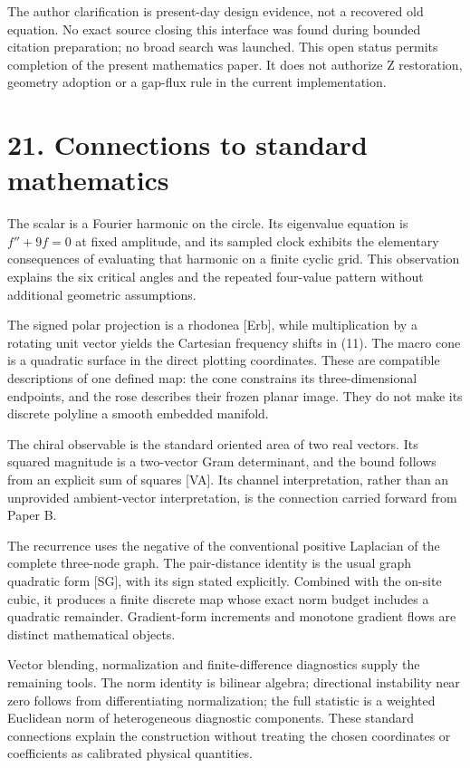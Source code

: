 \documentclass[
  11pt,
  a4paper,
]{article}
\begin{document}
The author clarification is present-day design evidence, not a recovered old equation. No exact source closing this interface was found during bounded citation preparation; no broad search was launched. This open status permits completion of the present mathematics paper. It does not authorize Z restoration, geometry adoption or a gap-flux rule in the current implementation.

\section{21. Connections to standard mathematics}\label{connections-to-standard-mathematics}

The scalar is a Fourier harmonic on the circle. Its eigenvalue equation is \(f''+9f=0\) at fixed amplitude, and its sampled clock exhibits the elementary consequences of evaluating that harmonic on a finite cyclic grid. This observation explains the six critical angles and the repeated four-value pattern without additional geometric assumptions.

The signed polar projection is a rhodonea {[}Erb{]}, while multiplication by a rotating unit vector yields the Cartesian frequency shifts in (11). The macro cone is a quadratic surface in the direct plotting coordinates. These are compatible descriptions of one defined map: the cone constrains its three-dimensional endpoints, and the rose describes their frozen planar image. They do not make its discrete polyline a smooth embedded manifold.

The chiral observable is the standard oriented area of two real vectors. Its squared magnitude is a two-vector Gram determinant, and the bound follows from an explicit sum of squares {[}VA{]}. Its channel interpretation, rather than an unprovided ambient-vector interpretation, is the connection carried forward from Paper B.

The recurrence uses the negative of the conventional positive Laplacian of the complete three-node graph. The pair-distance identity is the usual graph quadratic form {[}SG{]}, with its sign stated explicitly. Combined with the on-site cubic, it produces a finite discrete map whose exact norm budget includes a quadratic remainder. Gradient-form increments and monotone gradient flows are distinct mathematical objects.

Vector blending, normalization and finite-difference diagnostics supply the remaining tools. The norm identity is bilinear algebra; directional instability near zero follows from differentiating normalization; the full statistic is a weighted Euclidean norm of heterogeneous diagnostic components. These standard connections explain the construction without treating the chosen coordinates or coefficients as calibrated physical quantities.
\end{document}
